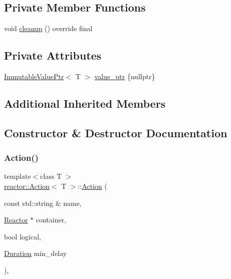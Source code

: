 \subsection*{Private Member Functions}
\begin{DoxyCompactItemize}
\item 
void \hyperlink{classreactor_1_1Action_a4ae275c1b030d5e8111469cc0ca5e09d}{cleanup} () override final
\end{DoxyCompactItemize}
\subsection*{Private Attributes}
\begin{DoxyCompactItemize}
\item 
\hyperlink{classreactor_1_1ImmutableValuePtr}{Immutable\+Value\+Ptr}$<$ T $>$ \hyperlink{classreactor_1_1Action_a0002a99457bb578aa89854ad71db4fb2}{value\+\_\+ptr} \{nullptr\}
\end{DoxyCompactItemize}
\subsection*{Additional Inherited Members}


\subsection{Constructor \& Destructor Documentation}
\mbox{\label{classreactor_1_1Action_ad0d36ea549eb0b04bd95d69fa8ac5d39}} 
\subsubsection{\texorpdfstring{Action()}{Action()}}
{\footnotesize\ttfamily template$<$class T $>$ \\
\hyperlink{classreactor_1_1Action}{reactor\+::\+Action}$<$ T $>$\+::\hyperlink{classreactor_1_1Action}{Action} (\begin{DoxyParamCaption}\item[{const std\+::string \&}]{name,  }\item[{\hyperlink{classreactor_1_1Reactor}{Reactor} $\ast$}]{container,  }\item[{bool}]{logical,  }\item[{\hyperlink{namespacereactor_aa8375b807a80703545664096c5b5b779}{Duration}}]{min\+\_\+delay }\end{DoxyParamCaption})\hspace{0.3cm}{\ttfamily [inline]}, {\ttfamily [protected]}}



